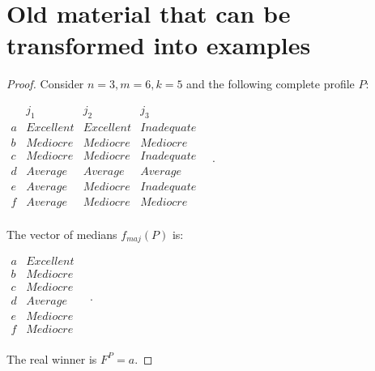 \documentclass[version=3.21, pagesize, twoside=off, bibliography=totoc, DIV=calc, fontsize=12pt, a4paper]{scrartcl}
\begin{document}
\section{Old material that can be transformed into examples}
\begin{proof} Consider $n=3, m=6, k=5$ and the following complete profile $P$:
	\begin{center}
		$
		\begin{array}{cccc}
			& j_1 & j_2 & j_3 \\
			a &	Excellent	& Excellent & Inadequate\\
			b &	Mediocre	& Mediocre	& Mediocre\\
			c &	Mediocre	& Mediocre & Inadequate\\
			d &	Average	& Average	& Average\\
			e &	Average	& Mediocre	& Inadequate \\
			f &	Average	& Mediocre & Mediocre	  \\
		\end{array} \quad.
		$
	\end{center}
	The vector of medians $f_{maj}(P)$ is:
	\begin{center}
		$
		\begin{array}{cc}
			a &	Excellent \\
			b &	Mediocre \\
			c &	Mediocre \\
			d &	Average	\\
			e &	Mediocre \\
			f & Mediocre \\
		\end{array} \quad.
		$
	\end{center}
	The real winner is $F^P=a$. 
	

\end{proof}
\end{document}
